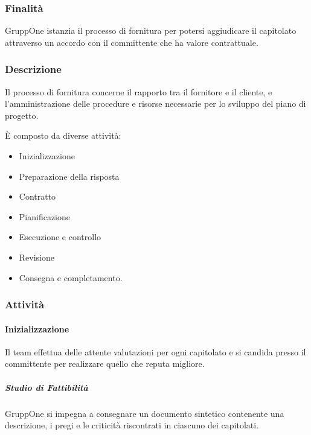 \documentclass[../../norme-di-progetto.tex]{subfiles}
\begin{document}
\subsubsection{Finalità}%
\label{subs:fornitura/finalita}

GruppOne istanzia il processo di fornitura per potersi aggiudicare il capitolato attraverso un accordo con il committente che ha valore contrattuale.

\subsubsection{Descrizione}%
\label{subs:fornitura/descrizione}

Il processo di fornitura concerne il rapporto tra il fornitore e il cliente, e l'amministrazione delle procedure e risorse necessarie per lo sviluppo del piano di progetto.

È composto da diverse attività:

\begin{itemize}
  \item Inizializzazione
  \item Preparazione della risposta
  \item Contratto
  \item Pianificazione
  \item Esecuzione e controllo
  \item Revisione
  \item Consegna e completamento.
\end{itemize}

\subsubsection{Attività}%
\label{subs:fornitura/attivita}

\paragraph{Inizializzazione}%
\label{par:inizializzazione}

Il team effettua delle attente valutazioni per ogni capitolato e si candida presso il committente per realizzare quello che reputa migliore.

\subparagraph{Studio di Fattibilità}%
\label{subp:studio_di_fattibilita}

GruppOne si impegna a consegnare un documento sintetico contenente una descrizione, i pregi e le criticità riscontrati in ciascuno dei capitolati.
\end{document}
